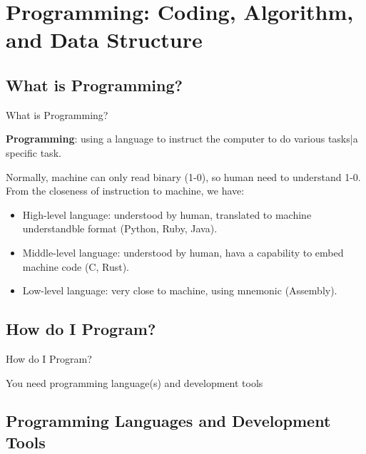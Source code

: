 \documentclass[10pt]{beamer}
\begin{document}
\section{Programming: Coding, Algorithm, and Data Structure}

  \subsection{What is Programming?}

    \begin{frame}[fragile]{What is Programming?}

      \textbf{Programming}: using a language to instruct the computer to do {various tasks|a specific task}.

      Normally, machine can only read binary (1-0), so human need to understand 1-0. From the
      closeness of instruction to machine, we have:
      \begin{itemize}
        \item High-level language: understood by human, translated to machine understandble format
          (Python, Ruby, Java).
        \item Middle-level language: understood by human, hava a capability to embed machine code
          (C, Rust).
        \item Low-level language: very close to machine, using mnemonic (Assembly).
      \end{itemize}
    \end{frame}

  \subsection{How do I Program?}

    \begin{frame}[fragile]{How do I Program?}

      You need programming language(s) and development tools

    \end{frame}

  \subsection{Programming Languages and Development Tools}
\end{document}
